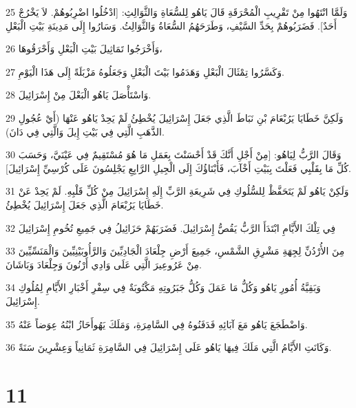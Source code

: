 \par 25 وَلَمَّا انْتَهُوا مِنْ تَقْرِيبِ الْمُحْرَقَةِ قَالَ يَاهُو لِلسُّعَاةِ وَالثَّوَالِثِ: [ادْخُلُوا اضْرِبُوهُمْ. لاَ يَخْرُجْ أَحَدٌ]. فَضَرَبُوهُمْ بِحَدِّ السَّيْفِ، وَطَرَحَهُمُ السُّعَاةُ وَالثَّوَالِثُ. وَسَارُوا إِلَى مَدِينَةِ بَيْتِ الْبَعْلِ
\par 26 وَأَخْرَجُوا تَمَاثِيلَ بَيْتِ الْبَعْلِ وَأَحْرَقُوهَا،
\par 27 وَكَسَّرُوا تِمْثَالَ الْبَعْلِ وَهَدَمُوا بَيْتَ الْبَعْلِ وَجَعَلُوهُ مَزْبَلَةً إِلَى هَذَا الْيَوْمِ.
\par 28 وَاسْتَأْصَلَ يَاهُو الْبَعْلَ مِنْ إِسْرَائِيلَ.
\par 29 وَلَكِنَّ خَطَايَا يَرُبْعَامَ بْنِ نَبَاطَ الَّذِي جَعَلَ إِسْرَائِيلَ يُخْطِئُ لَمْ يَحِدْ يَاهُو عَنْهَا (أَيْ عُجُولِ الذَّهَبِ الَّتِي فِي بَيْتِ إِيلَ وَالَّتِي فِي دَانَ).
\par 30 وَقَالَ الرَّبُّ لِيَاهُو: [مِنْ أَجْلِ أَنَّكَ قَدْ أَحْسَنْتَ بِعَمَلِ مَا هُوَ مُسْتَقِيمٌ فِي عَيْنَيَّ، وَحَسَبَ كُلِّ مَا بِقَلْبِي فَعَلْتَ بِبَيْتِ أَخْآبَ، فَأَبْنَاؤُكَ إِلَى الْجِيلِ الرَّابِعِ يَجْلِسُونَ عَلَى كُرْسِيِّ إِسْرَائِيلَ].
\par 31 وَلَكِنْ يَاهُو لَمْ يَتَحَفَّظْ لِلسُّلُوكِ فِي شَرِيعَةِ الرَّبِّ إِلَهِ إِسْرَائِيلَ مِنْ كُلِّ قَلْبِهِ. لَمْ يَحِدْ عَنْ خَطَايَا يَرُبْعَامَ الَّذِي جَعَلَ إِسْرَائِيلَ يُخْطِئُ.
\par 32 فِي تِلْكَ الأَيَّامِ ابْتَدَأَ الرَّبُّ يَقُصُّ إِسْرَائِيلَ. فَضَرَبَهُمْ حَزَائِيلُ فِي جَمِيعِ تُخُومِ إِسْرَائِيلَ
\par 33 مِنَ الأُرْدُنِّ لِجِهَةِ مَشْرِقِ الشَّمْسِ، جَمِيعَ أَرْضِ جِلْعَادَ الْجَادِيِّينَ وَالرَّأُوبَيْنِيِّينَ وَالْمَنَسِّيِّينَ مِنْ عَرُوعِيرَ الَّتِي عَلَى وَادِي أَرْنُونَ وَجِلْعَادَ وَبَاشَانَ.
\par 34 وَبَقِيَّةُ أُمُورِ يَاهُو وَكُلُّ مَا عَمَلَ وَكُلُّ جَبَرُوتِهِ مَكْتُوبَةٌ فِي سِفْرِ أَخْبَارِ الأَيَّامِ لِمُلُوكِ إِسْرَائِيلَ.
\par 35 وَاضْطَجَعَ يَاهُو مَعَ آبَائِهِ فَدَفَنُوهُ فِي السَّامِرَةِ، وَمَلَكَ يَهُوأَحَازُ ابْنُهُ عِوَضاً عَنْهُ.
\par 36 وَكَانَتِ الأَيَّامُ الَّتِي مَلَكَ فِيهَا يَاهُو عَلَى إِسْرَائِيلَ فِي السَّامِرَةِ ثَمَانِياً وَعِشْرِينَ سَنَةً.

\chapter{11}

